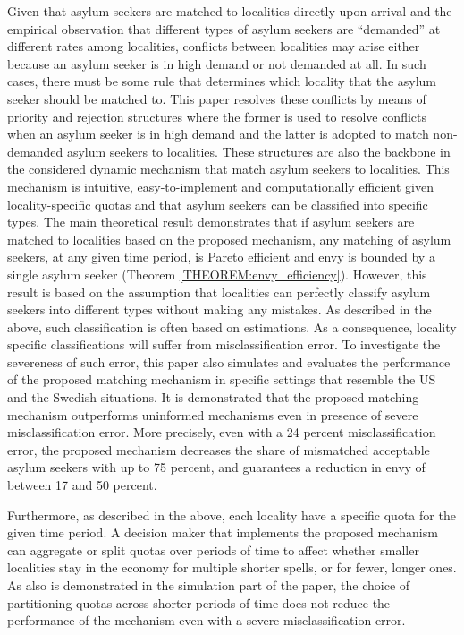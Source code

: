 \documentclass[12pt,fleqn]{article}
\begin{document}
Given that asylum seekers are matched to localities directly upon arrival and the empirical observation that different types of asylum seekers are ``demanded'' at different rates among localities, conflicts between localities may arise either because an asylum seeker is in high demand or not demanded at all. In such cases, there must be some rule that determines which locality that the asylum seeker should be matched to. This paper resolves these conflicts by means of priority and rejection structures where the former is used to resolve conflicts when an asylum seeker is in high demand and the latter is adopted to match non-demanded asylum seekers to localities. These structures are also the backbone in the considered dynamic mechanism that match asylum seekers to localities. This mechanism is intuitive, easy-to-implement and computationally efficient given locality-specific quotas and that asylum seekers can be classified into specific types. The main theoretical result demonstrates that if asylum seekers are matched to localities based on the proposed mechanism, any matching of asylum seekers, at any given time period, is Pareto efficient and envy is bounded by a single asylum seeker (Theorem \ref{THEOREM:envy_efficiency}). However, this result is based on the assumption that localities can perfectly classify asylum seekers into different types without making any mistakes. As described in the above, such classification is often based on estimations. As a consequence, locality specific classifications will suffer from misclassification error. To investigate the severeness of such error, this paper also simulates and evaluates the performance of the proposed matching mechanism in specific settings that resemble the US and the Swedish situations. It is demonstrated that the proposed matching mechanism outperforms uninformed mechanisms even in presence of severe misclassification error. More precisely, even with a 24 percent misclassification error, the proposed mechanism decreases the share of mismatched acceptable asylum seekers with up to 75 percent, and guarantees a reduction in envy of between 17 and 50 percent.

Furthermore, as described in the above, each locality have a specific quota for the given time period. A decision maker that implements the proposed mechanism can aggregate or split quotas over periods of time to affect whether smaller localities stay in the economy for multiple shorter spells, or for fewer, longer ones. As also is demonstrated in the simulation part of the paper, the choice of partitioning quotas across shorter periods of time does not reduce the performance of the mechanism even with a severe misclassification error.
\end{document}
